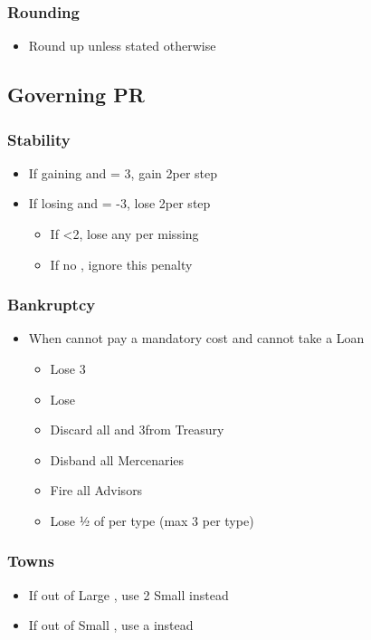 \documentclass[10pt]{article}
\begin{document}
\subsubsection*{Rounding}
\begin{itemize}
	\item Round up unless stated otherwise
\end{itemize}

\subsection*{Governing PR }
\subsubsection*{Stability }
\begin{itemize}
	\item If gaining \stability and \stability = 3, gain 2\adminpower per step
	\item If losing \stability and \stability = -3, lose 2\adminpower per step
	\begin{itemize}
		\item If <2\adminpower, lose any \monarchpower per missing \adminpower
		\item If no \monarchpower, ignore this penalty
	\end{itemize}
\end{itemize}

\subsubsection*{Bankruptcy }
\begin{itemize}
	\item When cannot pay a mandatory cost and cannot take a Loan
	\begin{itemize}
		\item Lose 3\stability
		\item Lose 
		\item Discard all \ducats and 3\interest from Treasury
		\item Disband all Mercenaries
		\item Fire all Advisors
		\item Lose ½ of \monarchpower per type (max 3 per type)
	\end{itemize}
\end{itemize}

\subsubsection*{Towns }
\begin{itemize}
	\item If out of Large \towns, use 2 Small \towns instead
	\item If out of Small \towns, use a \vassal instead
\end{itemize}
\end{document}

